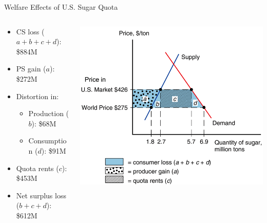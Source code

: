 \documentclass[10pt,hyperref={CJKbookmarks=true},xcolor=dvipsnames,aspectratio=169]{beamer}
\begin{document}
\begin{frame}{Welfare Effects of U.S. Sugar Quota}






\begin{columns}[onlytextwidth]
\begin{column}{0.4\textwidth}
\begin{itemize}
\item CS loss ($a+b+c+d$): \$884M 
\item PS gain ($a$): \$272M 
\item Distortion in: 

\begin{itemize}
\item Production ($b$): \$68M 
\item Consumption ($d$): \$91M 
\end{itemize}
\item Quota rents ($c$): \$453M 
\item Net surplus loss ($b+c+d$): \$612M
\end{itemize}

\end{column}
\begin{column}{0.6\textwidth}
\includegraphics[width=0.8\columnwidth]{fig/politic/lec07-13}
\end{column}
\end{columns}

\end{frame}
\end{document}

